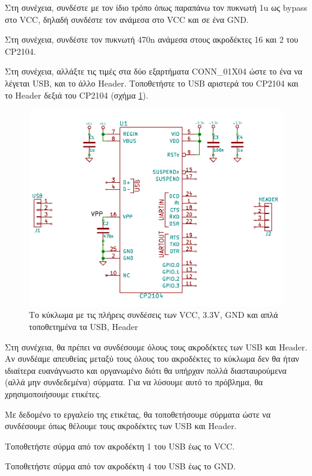 \documentclass[a4paper]{article}
\begin{document}
Στη συνέχεια, συνδέστε με τον ίδιο τρόπο όπως παραπάνω τον πυκνωτή 1u ως bypass στο VCC, δηλαδή συνδέστε τον ανάμεσα στο VCC και σε ένα GND.

Στη συνέχεια, συνδέστε τον πυκνωτή 470n ανάμεσα στους ακροδέκτες 16 και 2 του CP2104.

Στη συνέχεια, αλλάξτε τις τιμές στα δύο εξαρτήματα CONN\_01X04 ώστε το ένα να λέγεται USB, και το άλλο Header. Τοποθετήστε το USB αριστερά του CP2104 και το Header δεξιά του CP2104 (σχήμα \ref{fig:eesch-circ-allpwr}).

\begin{figure}
  \begin{center}
    \includegraphics[width=.9\textwidth]{img/eesch-circ-allpwr.png}
    \caption{Το κύκλωμα με τις πλήρεις συνδέσεις των VCC, 3.3V, GND και απλά τοποθετημένα τα USB, Header}
    \label{fig:eesch-circ-allpwr}
  \end{center}
\end{figure}

Στη συνέχεια, θα πρέπει να συνδέσουμε όλους τους ακροδέκτες των USB και Header. Αν συνδέαμε απευθείας μεταξύ τους όλους του ακροδέκτες το κύκλωμα δεν θα ήταν ιδιαίτερα ευανάγνωστο και οργανωμένο διότι θα υπήρχαν πολλά διασταυρούμενα (αλλά μην συνδεδεμένα) σύρματα. Για να λύσουμε αυτό το πρόβλημα, θα χρησιμοποιήσουμε ετικέτες.

Με δεδομένο το εργαλείο της ετικέτας, θα τοποθετήσουμε σύρματα ώστε να συνδέσουμε όπως θέλουμε τους ακροδέκτες των USB και Header.

Τοποθετήστε σύρμα από τον ακροδέκτη 1 του USB έως το VCC.

Τοποθετήστε σύρμα από τον ακροδέκτη 4 του USB έως το GND.
\end{document}

